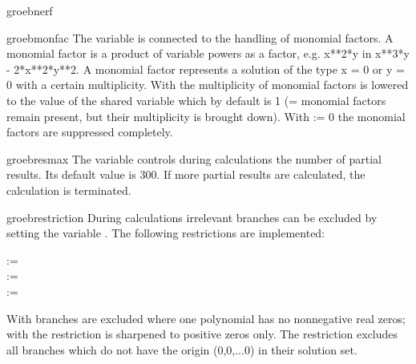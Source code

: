 \begin{Operator}{groebnerf}
\end{Operator}


\begin{Variable}{groebmonfac}
The variable  is connected to
the handling of monomial factors.  A monomial factor is a product
of variable powers as a factor, e.g. x**2*y  in  x**3*y -
2*x**2*y**2.  A monomial factor represents a solution of the type
 x = 0  or  y = 0 with a certain multiplicity.  With
 the multiplicity of monomial factors is lowered 
to the value of the shared variable 
which by default is 1 (= monomial factors remain present, but their
multiplicity is brought down). With
:= 0
the monomial factors are suppressed completely.
\end{Variable}

\begin{Variable}{groebresmax}
The variable 
controls  during  calculations
the number of partial results. Its default value is 300. If
more partial results are calculated, the calculation is
terminated.
\end{Variable}

\begin{Variable}{groebrestriction}
During  calculations 
irrelevant branches can be excluded
by setting the variable . The
following restrictions are implemented:
\begin{Syntax} 
      :=  \\
      := \\
      := 
\end{Syntax}
With  branches are excluded where one
polynomial has no nonnegative real zeros; with 
the restriction is sharpened to positive zeros only.
The restriction  excludes all branches
which do not have the origin (0,0,...0) in their solution
set.
\end{Variable}

